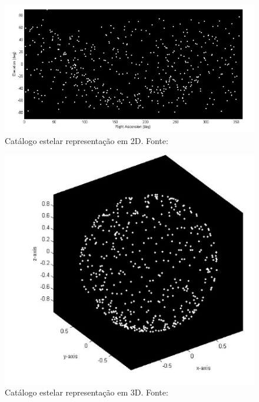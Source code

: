 \begin{figure}[H]
	\centering
	\includegraphics[width=.7\columnwidth]{images/Rrepresentacao_2D.png}
	\caption{Catálogo estelar representação em 2D. Fonte: ~\cite[]{Diaz}}
	\label{fig:Rrepresentacao_2D}
\end{figure}

\begin{figure}[H]
	\centering
	\includegraphics[width=.7\columnwidth]{images/Representacao_3D.png}
	\caption{Catálogo estelar representação em 3D. Fonte: ~\cite[]{Diaz}}
	\label{fig:Representacao_3D}
\end{figure}

